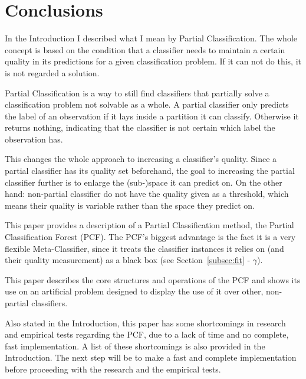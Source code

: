 \section{Conclusions}
\label{sec:conclusions}

In the Introduction I described what I mean by
Partial Classification. The whole concept is based on the
condition that a classifier needs to maintain a certain
quality in its predictions for a given classification
problem. If it can not do this, it is not regarded a
solution.

Partial Classification is a way to still find classifiers
that partially solve a classification problem not solvable
as a whole. A partial classifier only predicts the label
of an observation if it lays inside a partition it can
classify. Otherwise it returns nothing, indicating that
the classifier is not certain which label the observation
has.

This changes the whole approach to increasing a
classifier's quality. Since a partial classifier has its
quality set beforehand, the goal to increasing the partial
classifier further is to enlarge the (sub-)space it can
predict on. On the other hand: non-partial classifier do
not have the quality given as a threshold, which means
their quality is variable rather than the space they
predict on.

This paper provides a description of a Partial
Classification method, the Partial Classification Forest
(PCF). The PCF's biggest advantage is the fact it is a very
flexible Meta-Classifier, since it treats the classifier
instances it relies on (and their quality measurement) as a
black box (see Section~\ref{subsec:fit} - $\gamma$).

This paper describes the core structures and operations of
the PCF and shows its use on an artificial problem designed
to display the use of it over other, non-partial
classifiers.

Also stated in the Introduction, this paper has some
shortcomings in research and empirical tests regarding the
PCF, due to a lack of time and no complete, fast
implementation. A list of these shortcomings is also
provided in the Introduction. The next step will be to make
a fast and complete implementation before proceeding with
the research and the empirical tests.
